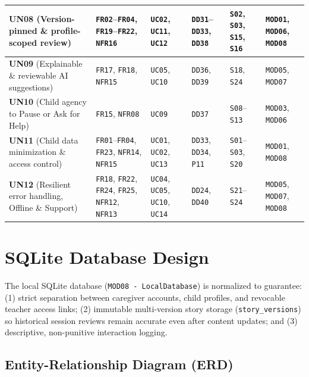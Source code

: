 \begin{footnotesize}
\begin{xltabular}{\textwidth}{|p{1.5cm}|p{2.2cm}|X|p{2.0cm}|p{2.0cm}|p{1.8cm}|}
\textbf{UN08} (Version-pinned \& profile-scoped review) & \texttt{FR02}–\texttt{FR04}, \texttt{FR19}–\texttt{FR22}, \texttt{NFR16} & \texttt{UC02}, \texttt{UC11}, \texttt{UC12} & \texttt{DD31}–\texttt{DD33}, \texttt{DD38} & \texttt{S02}, \texttt{S03}, \texttt{S15}, \texttt{S16} & \texttt{MOD01}, \texttt{MOD06}, \texttt{MOD08} \\ \hline
\textbf{UN09} (Explainable \& reviewable AI suggestions) & \texttt{FR17}, \texttt{FR18}, \texttt{NFR15} & \texttt{UC05}, \texttt{UC10} & \texttt{DD36}, \texttt{DD39} & \texttt{S18}, \texttt{S24} & \texttt{MOD05}, \texttt{MOD07} \\ \hline
\textbf{UN10} (Child agency to Pause or Ask for Help) & \texttt{FR15}, \texttt{NFR08} & \texttt{UC09} & \texttt{DD37} & \texttt{S08}–\texttt{S13} & \texttt{MOD03}, \texttt{MOD06} \\ \hline
\textbf{UN11} (Child data minimization \& access control) & \texttt{FR01}–\texttt{FR04}, \texttt{FR23}, \texttt{NFR14}, \texttt{NFR15} & \texttt{UC01}, \texttt{UC02}, \texttt{UC13} & \texttt{DD33}, \texttt{DD34}, \texttt{P11} & \texttt{S01}–\texttt{S03}, \texttt{S20} & \texttt{MOD01}, \texttt{MOD08} \\ \hline
\textbf{UN12} (Resilient error handling, Offline \& Support) & \texttt{FR18}, \texttt{FR22}, \texttt{FR24}, \texttt{FR25}, \texttt{NFR12}, \texttt{NFR13} & \texttt{UC04}, \texttt{UC05}, \texttt{UC10}, \texttt{UC14} & \texttt{DD24}, \texttt{DD40} & \texttt{S21}–\texttt{S24} & \texttt{MOD05}, \texttt{MOD07}, \texttt{MOD08} \\ \hline
\end{xltabular}
\end{footnotesize}



\section{SQLite Database Design}


The local SQLite database (\texttt{MOD08 - LocalDatabase}) is normalized to guarantee: (1) strict separation between caregiver accounts, child profiles, and revocable teacher access links; (2) immutable multi-version story storage (\texttt{story\_versions}) so historical session reviews remain accurate even after content updates; and (3) descriptive, non-punitive interaction logging.


\subsection{Entity-Relationship Diagram (ERD)}



